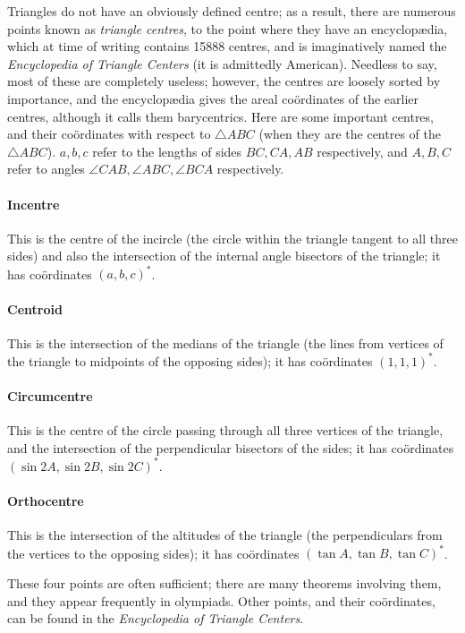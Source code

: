 \begin{multicols}{2}

Triangles do not have an obviously defined centre; as a result, there are numerous points known as \textit{triangle centres}, to the point where they have an encyclop\ae{}dia, which at time of writing contains 15888 centres, and is imaginatively named the \textit{Encyclopedia of Triangle Centers} (it is admittedly American). Needless to say, most of these are completely useless; however, the centres are loosely sorted by importance, and the encyclop\ae{}dia gives the areal co\"ordinates of the earlier centres, although it calls them barycentrics. Here are some important centres, and their co\"ordinates with respect to \(\triangle{}ABC\) (when they are the centres of the \(\triangle{}ABC\)). \(a,b,c\) refer to the lengths of sides \(BC,CA,AB\) respectively, and \(A,B,C\) refer to angles \(\angle{}CAB,\angle{}ABC,\angle{}BCA\) respectively.

\paragraph{Incentre} This is the centre of the incircle (the circle within the triangle tangent to all three sides) and also the intersection of the internal angle bisectors of the triangle; it has co\"ordinates \((a,b,c)^*\).

\paragraph{Centroid} This is the intersection of the medians of the triangle (the lines from vertices of the triangle to midpoints of the opposing sides); it has co\"ordinates \((1,1,1)^*\).

\paragraph{Circumcentre} This is the centre of the circle passing through all three vertices of the triangle, and the intersection of the perpendicular bisectors of the sides; it has co\"ordinates \((\sin{}2A,\sin{}2B,\sin{}2C)^*\).

\paragraph{Orthocentre} This is the intersection of the altitudes of the triangle (the perpendiculars from the vertices to the opposing sides); it has co\"ordinates \((\tan{}A,\tan{}B,\tan{}C)^*\).

\begin{center}
\end{center}

These four points are often sufficient; there are many theorems involving them, and they appear frequently in olympiads. Other points, and their co\"ordinates, can be found in the \textit{Encyclopedia of Triangle Centers}.
\end{multicols}
